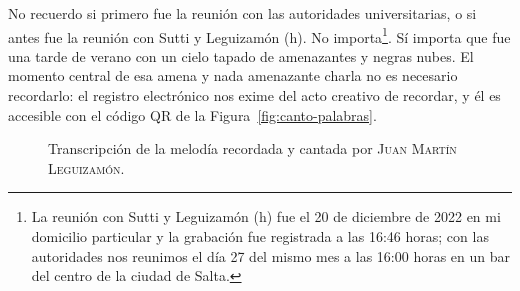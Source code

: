 No recuerdo si primero fue la reunión con las autoridades universitarias, o si antes fue la reunión con Sutti y Leguizamón (h). No importa\footnote{La reunión con Sutti y Leguizamón (h) fue el 20 de diciembre de 2022 en mi domicilio particular y la grabación fue registrada a las 16:46 horas; con las autoridades nos reunimos el día 27 del mismo mes a las 16:00 horas en un bar del centro de la ciudad de Salta.}. Sí importa que fue una tarde de verano con un cielo tapado de amenazantes y negras nubes. El momento central de esa amena y nada amenazante charla no es necesario recordarlo: el registro electrónico nos exime del acto creativo de recordar, y él es accesible con el código QR de la Figura~\ref{fig:canto-palabras}.

\begin{figure}[htb]
\caption[Transcripción de un fragmento de la melodía recordada.]{Transcripción de la melodía recordada y cantada por \textsc{Juan Martín Leguizamón.}}
\label{fig:Transcripcion}
\end{figure}

%
%
